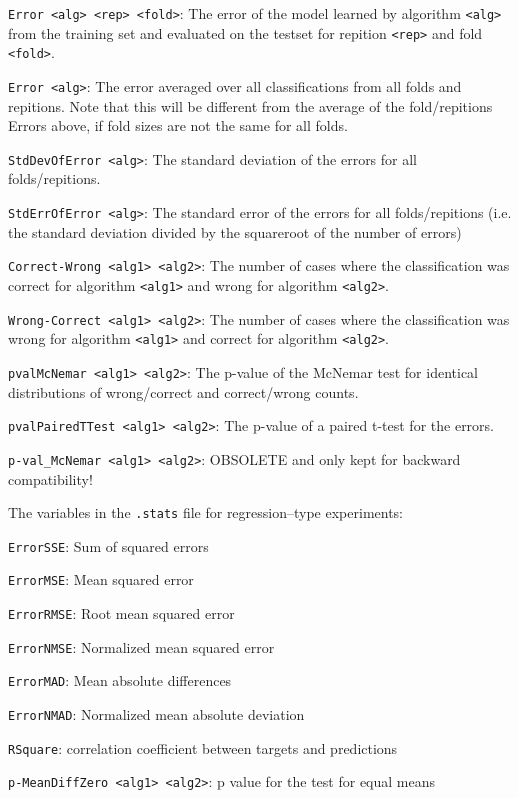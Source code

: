 \documentclass[a4paper,10pt,twoside]{article}
\newenvironment{optionlist}
{\begin{list}{}
    {\setlength{\itemsep}{0em plus0em minus0ex}
      \setlength{\parsep}{0ex}
      \setlength{\topsep}{0em}
      \setlength{\leftmargin}{2em}
      \setlength{\listparindent}{0em}
      \setlength{\itemindent}{-2em}
      \setlength{\partopsep}{0ex}
    }}
  {\end{list}}
\begin{document}
\begin{optionlist}
\item \verb=Error <alg> <rep> <fold>=: The error of the model learned by
algorithm \verb=<alg>= from 
the training set and evaluated on the testset 
for repition \verb=<rep>= and fold \verb=<fold>=.
\item \verb=Error <alg>=: The error averaged over all classifications
from all folds and repitions. Note that this will be different from the
average of the fold/repitions Errors above, if fold sizes are not
the same for all folds.
\item \verb=StdDevOfError <alg>=: The standard deviation of the errors
for all folds/repitions.
\item \verb=StdErrOfError <alg>=: The standard error of the errors for 
all folds/repitions (i.e. the standard deviation divided by the squareroot
of the number of errors)
\item \verb=Correct-Wrong <alg1> <alg2>=: The number of cases where
  the classification was correct for algorithm \verb=<alg1>= and wrong
  for algorithm \verb=<alg2>=.
\item \verb=Wrong-Correct <alg1> <alg2>=: The number of cases where
  the classification was wrong for algorithm \verb=<alg1>= and correct
  for algorithm \verb=<alg2>=.
\item \verb=pvalMcNemar <alg1> <alg2>=: The p-value of the McNemar
test for identical distributions of wrong/correct and correct/wrong
counts.
\item \verb=pvalPairedTTest <alg1> <alg2>=: The p-value of a 
paired t-test for the errors.
\item \verb=p-val_McNemar <alg1> <alg2>=: OBSOLETE and only kept for 
backward compatibility!
\end{optionlist}

The variables in the \verb=.stats= file 
for regression--type experiments:

\begin{optionlist}
\item \verb=ErrorSSE=: Sum of squared errors
\item \verb=ErrorMSE=: Mean squared error
\item \verb=ErrorRMSE=: Root mean squared error
\item \verb=ErrorNMSE=: Normalized mean squared error
\item \verb=ErrorMAD=: Mean absolute differences
\item \verb=ErrorNMAD=: Normalized mean absolute deviation
\item \verb=RSquare=: correlation coefficient between targets and predictions
\item \verb=p-MeanDiffZero <alg1> <alg2>=: p value for the test for equal means
\end{optionlist}
\end{document}
